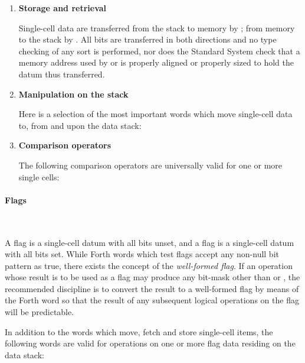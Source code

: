 \begin{enumerate}
\item \textbf{Storage and retrieval}

	Single-cell data are transferred from the stack to memory by
	\word{!}; from memory to the stack by . All bits are
	transferred in both directions and no type checking of any sort
	is performed, nor does the Standard System check that a memory
	address used by \word{!} or  is properly aligned or
	properly sized to hold the datum thus transferred.

\item \textbf{Manipulation on the stack}

	Here is a selection of the most important words which move
	single-cell data to, from and upon the data stack:
	\begin{quote}\ttfamily
		\word{!}			
					
					
	\end{quote}

\item \textbf{Comparison operators}

	The following comparison operators are universally valid for one
	or more single cells:
	\begin{quote}\ttfamily
		\word{=}			
	\end{quote}
\end{enumerate}


\paragraph{Flags} ~ %

A  flag is a single-cell datum with all bits unset, and
a  flag is a single-cell datum with all bits set. While
Forth words which test flags accept any non-null bit pattern as true,
there exists the concept of the \emph{well-formed flag}. If an
operation whose result is to be used as a flag may produce any
bit-mask other than  or , the recommended
discipline is to convert the result to a well-formed flag by means
of the Forth word  so that the result of any subsequent
logical operations on the flag will be predictable.

In addition to the words which move, fetch and store single-cell
items, the following words are valid for operations on one or more
flag data residing on the data stack:
\begin{quote}\ttfamily
				
\end{quote}


